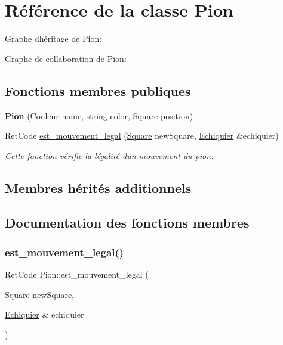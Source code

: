\hypertarget{classPion}{}\section{Référence de la classe Pion}
\label{classPion}


Graphe d\textquotesingle{}héritage de Pion\+:


Graphe de collaboration de Pion\+:
\subsection*{Fonctions membres publiques}
\begin{DoxyCompactItemize}
\item 
\mbox{\label{classPion_aaa25f00fdda58f136c8680c054f56764}} 
{\bfseries Pion} (Couleur name, string color, \hyperlink{classSquare}{Square} position)
\item 
Ret\+Code \hyperlink{classPion_aa7c1043d5491beec7aa809902a08c6b6}{est\+\_\+mouvement\+\_\+legal} (\hyperlink{classSquare}{Square} new\+Square, \hyperlink{classEchiquier}{Echiquier} \&echiquier)
\begin{DoxyCompactList}\small\item\em Cette fonction vérifie la légalité d\textquotesingle{}un mouvement du pion. \end{DoxyCompactList}\end{DoxyCompactItemize}
\subsection*{Membres hérités additionnels}


\subsection{Documentation des fonctions membres}
\mbox{\label{classPion_aa7c1043d5491beec7aa809902a08c6b6}} 
\subsubsection{\texorpdfstring{est\+\_\+mouvement\+\_\+legal()}{est\_mouvement\_legal()}}
{\footnotesize\ttfamily Ret\+Code Pion\+::est\+\_\+mouvement\+\_\+legal (\begin{DoxyParamCaption}\item[{\hyperlink{classSquare}{Square}}]{new\+Square,  }\item[{\hyperlink{classEchiquier}{Echiquier} \&}]{echiquier }\end{DoxyParamCaption})\hspace{0.3cm}{\ttfamily [virtual]}}



